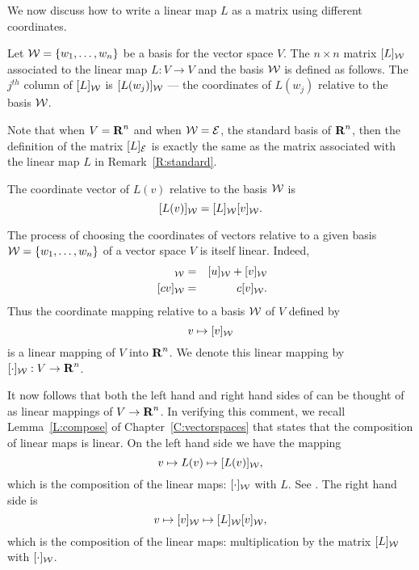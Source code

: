 We now discuss how to write a linear map $L$ as a matrix using
different coordinates.
\begin{Def} \label{D:matrixincoord}
Let ${\cal W} = \{w_1,\ldots,w_n\}$ be a basis for the vector
space $V$. The $n\times n$ matrix $[L]_{\cal W}$ associated to
the linear map $L:V\to V$ and the basis ${\cal W}$ is defined
as follows.  The $j^{th}$ column of $[L]_{\cal W}$ is
$[L(w_j)]_{\cal W}$ --- the coordinates of $L(w_j)$ relative
to the basis ${\cal W}$.
\end{Def} 

Note that when $V=\mbox{$\bf{R}$}^n$ and when ${\cal W} = {\cal E}$, the
standard basis of $\mbox{$\bf{R}$}^n$, then the definition of the matrix
$[L]_{\cal E}$ is exactly the same as the matrix associated
with the linear map $L$ in Remark~\ref{R:standard}.

\begin{lemma}
The coordinate vector of $L(v)$ relative to the basis ${\cal W}$ is
\begin{equation} \label{e:matrixofL}
[L(v)]_{\cal W} = [L]_{\cal W} [v]_{\cal W}.
\end{equation}
\end{lemma}  

\proof The process of choosing the coordinates of vectors relative to
a given basis ${\cal W} =\{w_1,\ldots,w_n\}$ of a vector space $V$
is itself linear.  Indeed,
\begin{eqnarray*}
[u+v]_{\cal W} & = & [u]_{\cal W} + [v]_{\cal W} \\
  \; [cv]_{\cal W}  & = &  c[v]_{\cal W}.
\end{eqnarray*}
Thus the coordinate mapping relative to a basis ${\cal W}$ of $V$
defined by
\begin{equation}  \label{e:coordmap}
v \mapsto [v]_{\cal W}
\end{equation}
is a linear mapping of $V$ into $\mbox{$\bf{R}$}^n$.  We denote this linear
mapping by $[\cdot]_{\cal W}:V\to\mbox{$\bf{R}$}^n$.


It now follows that both the left hand and right hand sides of
 can be thought of as linear mappings of $V\to\mbox{$\bf{R}$}^n$.
In verifying this comment, we recall Lemma~\ref{L:compose} of
Chapter~\ref{C:vectorspaces} that states that the composition of linear
maps is linear.  On the left hand side we have the mapping
\[
v \mapsto L(v) \mapsto [L(v)]_{\cal W},
\]
which is the composition of the linear maps: $[\cdot]_{\cal W}$ with
$L$.  See .  The right hand side is
\[
v \mapsto [v]_{\cal W} \mapsto [L]_{\cal W} [v]_{\cal W},
\]
which is the composition of the linear maps:  multiplication by the
matrix $[L]_{\cal W}$ with $[\cdot]_{\cal W}$.

